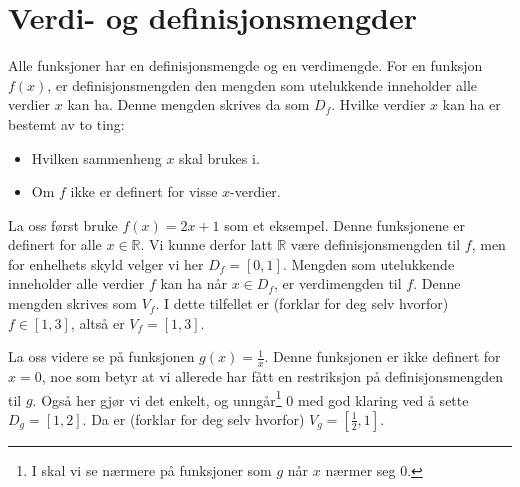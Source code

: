 \section{Verdi- og definisjonsmengder}
Alle funksjoner har en definisjonsmengde og en verdimengde. For en funksjon $ f(x) $, er definisjonsmengden den mengden som utelukkende inneholder alle verdier $ x $ kan ha. Denne mengden skrives da som $ D_f $. Hvilke verdier $ x $ kan ha er bestemt av to ting:
\begin{itemize}
	\item Hvilken sammenheng $ x $ skal brukes i.
	\item Om $ f $ ikke er definert for visse $ x $-verdier.
\end{itemize}

La oss først bruke $ f(x)=2x+1 $ som et eksempel. Denne funksjonene er definert for alle $ x\in \mathbb{R} $. Vi kunne derfor latt $ \mathbb{R} $ være definisjonsmengden til $ f $, men for enhelhets skyld velger vi her $ D_f=[0, 1] $. Mengden som utelukkende inneholder alle verdier $ f $ kan ha når $ x\in D_f $, er verdimengden til $ f $. Denne mengden skrives som $ V_f $. I dette tilfellet er (forklar for deg selv hvorfor) $ f\in [1, 3] $, altså er $ V_f=[1, 3] $.\vsk

La oss videre se på funksjonen $ g(x)=\frac{1}{x} $. Denne funksjonen er ikke definert for $ x=0 $, noe som betyr at vi allerede har fått en restriksjon på definisjonsmengden til $ g $. Også her gjør vi det enkelt, og unngår\footnote{I  skal vi se nærmere på funksjoner som $ g $ når $ x $ nærmer seg 0.} 0 med god klaring ved å sette $ D_g=[1, 2] $. Da er (forklar for deg selv hvorfor) $ V_g=\left[\frac{1}{2}, 1\right] $.\regv
 
